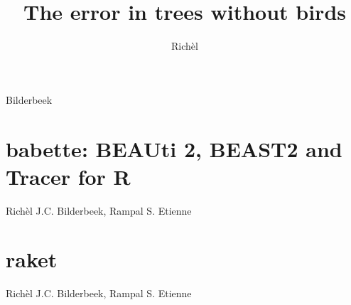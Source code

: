 \documentclass[]{dissertation}
\begin{document}
\title{The error in trees without birds}
\author{Rich\`el}{Bilderbeek}

\frontmatter




\tableofcontents



%

\mainmatter

\thumbtrue



\chapter{babette: BEAUti 2, BEAST2 and Tracer for R}
\label{chapter_babette}
Rich\`el J.C. Bilderbeek, Rampal S. Etienne
\newpage



\chapter{raket}
\label{chapter_raket}
Rich\`el J.C. Bilderbeek, Rampal S. Etienne
\newpage




%

% 

\appendix

%

\thumbfalse

% 
% 
\end{document}
